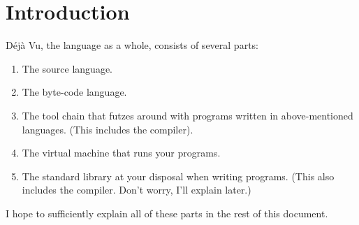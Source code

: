 \chapter{Introduction}

Déjà Vu, the language as a whole, consists of several parts:

\begin{enumerate}
\item The source language.
\item The byte-code language.
\item The tool chain that futzes around with programs written in
      above-mentioned languages. (This includes the compiler).
\item The virtual machine that runs your programs.
\item The standard library at your disposal when writing programs.
      (This also includes the compiler. Don't worry, I'll explain
      later.)
\end{enumerate}

I hope to sufficiently explain all of these parts in the rest of this
document.
